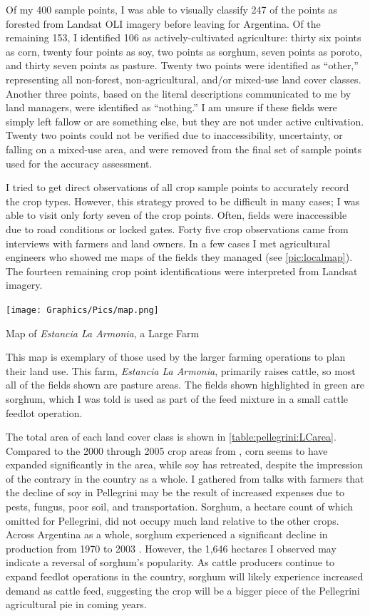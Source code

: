 Of my 400 sample points, I was able to visually classify 247 of the points as forested from Landsat OLI imagery before leaving for Argentina. Of the remaining 153, I identified 106 as actively-cultivated agriculture: thirty six points as corn, twenty four points as soy, two points as sorghum, seven points as poroto, and thirty seven points as pasture. Twenty two points were identified as ``other,'' representing all non-forest, non-agricultural, and/or mixed-use land cover classes. Another three points, based on the literal descriptions communicated to me by land managers, were identified as ``nothing.'' I am unsure if these fields were simply left fallow or are something else, but they are not under active cultivation. Twenty two points could not be verified due to inaccessibility, uncertainty, or falling on a mixed-use area, and were removed from the final set of sample points used for the accuracy assessment.

I tried to get direct observations of all crop sample points to accurately record the crop types. However, this strategy proved to be difficult in many cases; I was able to visit only forty seven of the crop points. Often, fields were inaccessible due to road conditions or locked gates. Forty five crop observations came from interviews with farmers and land owners. In a few cases I met agricultural engineers who showed me maps of the fields they managed (see \autoref{pic:localmap}). The fourteen remaining crop point identifications were interpreted from Landsat imagery.

\begin{ssfigure}
  \centering
  \texttt{[image: Graphics/Pics/map.png]}
  \caption{Map of \textit{Estancia La Armonia}, a Large Farm}
  \label{pic:localmap}
  \medskip
  \small
  This map is exemplary of those used by the larger farming operations to plan their land use. This farm, \textit{Estancia La Armonia}, primarily raises cattle, so most all of the fields shown are pasture areas. The fields shown highlighted in green are sorghum, which I was told is used as part of the feed mixture in a small cattle feedlot operation.
\end{ssfigure}

The total area of each land cover class is shown in \autoref{table:pellegrini:LCarea}. Compared to the 2000 through 2005 crop areas from \textcite{volante2005analisis}, corn seems to have expanded significantly in the area, while soy has retreated, despite the impression of the contrary in the country as a whole. I gathered from talks with farmers that the decline of soy in Pellegrini may be the result of increased expenses due to pests, fungus, poor soil, and transportation. Sorghum, a hectare count of which \citeauthor{volante2005analisis} omitted for Pellegrini, did not occupy much land relative to the other crops. Across Argentina as a whole, sorghum experienced a significant decline in production from 1970 to 2003 \autocite{paruelo2005expansion}. However, the 1,646 hectares I observed may indicate a reversal of sorghum's popularity. As cattle producers continue to expand feedlot operations in the country, sorghum will likely experience increased demand as cattle feed, suggesting the crop will be a bigger piece of the Pellegrini agricultural pie in coming years.

